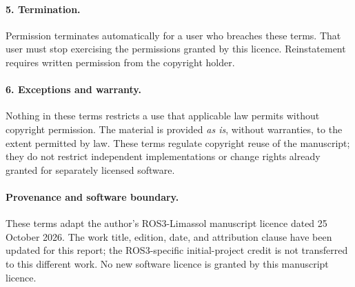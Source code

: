 \paragraph{5. Termination.}
Permission terminates automatically for a user who breaches these terms.
That user must stop exercising the permissions granted by this licence.
Reinstatement requires written permission from the copyright holder.

\paragraph{6. Exceptions and warranty.}
Nothing in these terms restricts a use that applicable law permits without
copyright permission. The material is provided \emph{as is}, without warranties,
to the extent permitted by law. These terms regulate copyright reuse of the
manuscript; they do not restrict independent implementations or change rights
already granted for separately licensed software.

\paragraph{Provenance and software boundary.}
These terms adapt the author's ROS3-Limassol manuscript licence dated 25 October 2026.
The work title, edition, date, and attribution clause have been updated for this report;
the ROS3-specific initial-project credit is not transferred to this different work.
No new software licence is granted by this manuscript licence.
